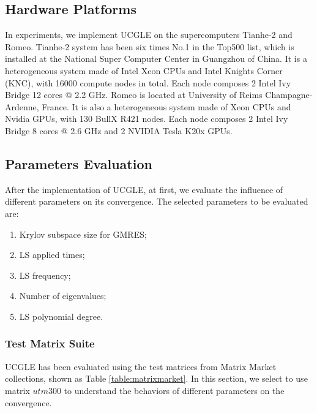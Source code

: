 \subsection{Hardware Platforms}

In experiments, we implement UCGLE on the supercomputers Tianhe-2 and Romeo. Tianhe-2 system has been six times No.1 in the Top500 list, which is installed at the National Super Computer Center in Guangzhou of China. It is a heterogeneous system made of Intel Xeon CPUs and Intel Knights Corner (KNC), with 16000 compute nodes in total. Each node composes 2 Intel Ivy Bridge 12 cores @ 2.2 GHz. Romeo is located at University of Reims Champagne-Ardenne, France. It is also a heterogeneous system made of Xeon CPUs and Nvidia GPUs, with 130 BullX R421 nodes. Each node composes 2 Intel Ivy Bridge 8 cores @ 2.6 GHz and 2 NVIDIA Tesla K20x GPUs.

\subsection{Parameters Evaluation}

After the implementation of UCGLE, at first, we evaluate the influence of different parameters on its convergence. The selected parameters to be evaluated are:

\begin{enumerate}
	\item Krylov subspace size for GMRES;
	\item LS applied times;
	\item LS frequency;
	\item Number of eigenvalues;
	\item LS polynomial degree.
\end{enumerate}

\subsubsection{Test Matrix Suite}

UCGLE has been evaluated using the test matrices from Matrix Market collections, shown as Table \ref{table:matrixmarket}. In this section, we select to use matrix $utm300$ to understand the behaviors of different parameters on the convergence.

